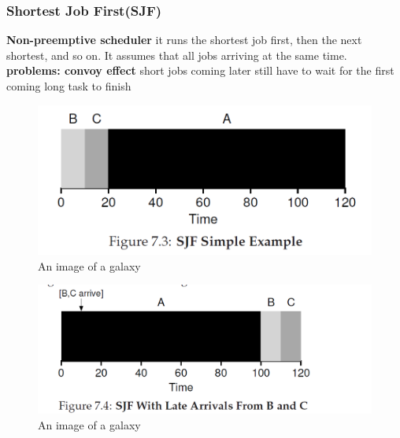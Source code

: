 \documentclass{article}
\begin{document}
\subsubsection{Shortest Job First(SJF)}
\textbf{\color{red} Non-preemptive scheduler}
{\color{red}it runs the
shortest job first, then the next shortest, and so on. It assumes that all jobs arriving at the same time.}
\textbf{problems: convoy effect} short jobs coming later still have to wait for the first coming long task to finish
\begin{figure}[H]
    \centering
    \includegraphics[width=13cm] {fig7.3.png}
    \caption{An image of a galaxy}
    \label{fig:galaxy}
\end{figure}
\begin{figure}[H]
    \centering
    \includegraphics[width=13cm] {fig7.4.png}
    \caption{An image of a galaxy}
    \label{fig:galaxy}
\end{figure}
\end{document}

